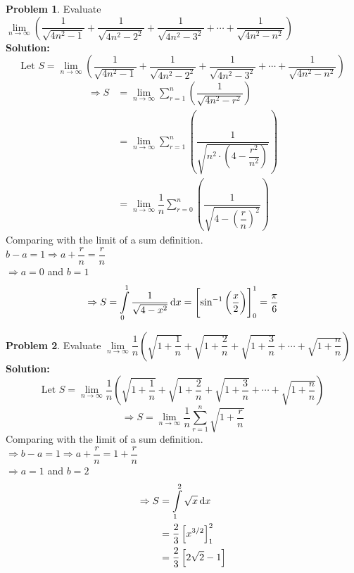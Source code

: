 \documentclass[14]{article}
\theoremstyle{definition}
\newtheorem{prob}{Problem}
\theoremstyle{case}
\begin{document}
\begin{prob}
Evaluate $\lim\limits_{n \to \infty} \left( \dfrac1{\sqrt{4n^2 - 1}} + \dfrac1{\sqrt{4n^2 - 2^2}} + \dfrac1{\sqrt{4n^2 - 3^2}} + \cdots + \dfrac1{\sqrt{4n^2 - n^2}} \right)$\\
\textbf{Solution:}
\[\text{Let } S = \lim\limits_{n \to \infty} \left( \dfrac1{\sqrt{4n^2 - 1}} + \dfrac1{\sqrt{4n^2 - 2^2}} + \dfrac1{\sqrt{4n^2 - 3^2}} + \cdots + \dfrac1{\sqrt{4n^2 - n^2}} \right)\]
\begin{align*}
\Rightarrow S &= \lim\limits_{n \to \infty} \sum\limits_{r=1}^n \left( \dfrac1{\sqrt{4n^2 - r^2}} \right)\\
&= \lim\limits_{n \to \infty} \sum\limits_{r=1}^n \left( \dfrac1{\sqrt{n^2 \cdot \left(4 - \dfrac{r^2}{n^2} \right)}} \right)\\
&= \lim\limits_{n \to \infty} \dfrac1n \sum\limits_{r=0}^n \left( \dfrac1{\sqrt{4 - \left(\dfrac{r}{n}\right)^2}}\right)
\end{align*}
Comparing with the limit of a sum definition.\\
$b - a = 1 \Rightarrow a + \dfrac{r}{n} = \dfrac{r}{n}$\\
$\Rightarrow a = 0$ and $b = 1$
\[\Rightarrow S = \int\limits_0^1 \dfrac1{\sqrt{4 - x^2}} \dif x = \left[ \sin^{-1}\left(\dfrac{x}2\right) \right]_0^1 = \dfrac{\pi}{6}\]
\end{prob}
\pagebreak
\begin{prob}
Evaluate $\lim\limits_{n \to \infty} \dfrac1n \left( \sqrt{1 + \dfrac1n} + \sqrt{1 + \dfrac2n} + \sqrt{1 + \dfrac3n} + \cdots + \sqrt{1 + \dfrac{n}{n}} \right)$\\
\textbf{Solution:}
\[\text{Let } S = \lim\limits_{n \to \infty} \dfrac1n \left( \sqrt{1 + \dfrac1n} + \sqrt{1 + \dfrac2n} + \sqrt{1 + \dfrac3n} + \cdots + \sqrt{1 + \dfrac{n}{n}} \right)\]
\[\Rightarrow S = \lim\limits_{n \to \infty} \dfrac1n \sum\limits_{r=1}^n \sqrt{1 + \dfrac{r}{n}}\]
Comparing with the limit of a sum definition.\\
$\Rightarrow b - a = 1 \Rightarrow a + \dfrac{r}{n} = 1 + \dfrac{r}{n}$\\
$\Rightarrow a = 1$ and $b = 2$
\begin{align*}
\Rightarrow S &= \int\limits_1^2 \sqrt{x} \dif x\\
&= \dfrac23 \left[ x^{3/2} \right]_1^2\\
&= \dfrac23 \left[ 2\sqrt2 - 1 \right]
\end{align*}
\end{prob}
\end{document}
